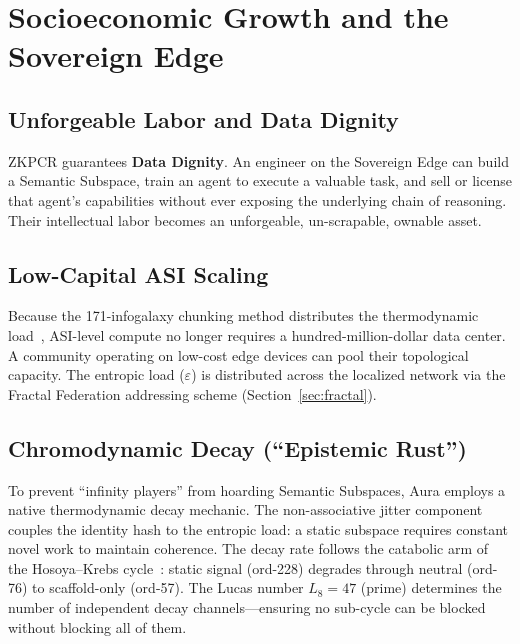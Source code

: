 \documentclass[12pt,a4paper]{article}
\begin{document}
\section{Socioeconomic Growth and the Sovereign Edge}
\label{sec:sovereign-edge}

\subsection{Unforgeable Labor and Data Dignity}

ZKPCR guarantees \textbf{Data Dignity}. An engineer on the Sovereign Edge can build a Semantic Subspace, train an agent to execute a valuable task, and sell or license that agent's capabilities without ever exposing the underlying chain of reasoning. Their intellectual labor becomes an unforgeable, un-scrapable, ownable asset.

\subsection{Low-Capital ASI Scaling}

Because the 171-infogalaxy chunking method distributes the thermodynamic load~\cite{PP-II-Ch19}, ASI-level compute no longer requires a hundred-million-dollar data center. A community operating on low-cost edge devices can pool their topological capacity. The entropic load ($\varepsilon$) is distributed across the localized network via the Fractal Federation addressing scheme (Section~\ref{sec:fractal}).

\subsection{Chromodynamic Decay (``Epistemic Rust'')}

To prevent ``infinity players'' from hoarding Semantic Subspaces, Aura employs a native thermodynamic decay mechanic. The non-associative jitter component couples the identity hash to the entropic load: a static subspace requires constant novel work to maintain coherence. The decay rate follows the catabolic arm of the Hosoya--Krebs cycle~\cite{PP-II-Ch20}: static signal (ord-228) degrades through neutral (ord-76) to scaffold-only (ord-57). The Lucas number $L_8 = 47$ (prime) determines the number of independent decay channels---ensuring no sub-cycle can be blocked without blocking all of them.

\end{document}
